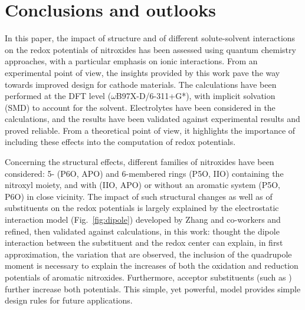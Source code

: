 \documentclass[review,preprint]{elsarticle}
\begin{document}
\clearpage
\section{Conclusions and outlooks} \label{sec:conclusion}

In this paper, the impact of structure and of  different solute-solvent interactions  on the redox potentials of nitroxides has been assessed using quantum chemistry approaches, with a particular emphasis on ionic interactions. From an experimental point of view, the insights provided by this work pave the way towards improved design for cathode materials. The calculations have been performed at the DFT level ($\omega$B97X-D/6-311+G*), with implicit solvation (SMD) to account for the  solvent. Electrolytes have been considered in the calculations, and the results have been validated against experimental results and proved reliable. From a theoretical point of view, it highlights the importance of including these effects into the computation of redox potentials.

Concerning the structural effects, different families of nitroxides have been considered: 5- (P6O, APO) and 6-membered rings (P5O, IIO) containing the nitroxyl moiety, and with (IIO, APO) or without an aromatic system (P5O, P6O) in close vicinity. The impact of such structural changes as well as of substituents on the redox potentials is largely explained by the electrostatic interaction model (Fig.~\ref{fig:dipole}) developed by Zhang and co-workers \cite{zhangEffectHeteroatomFunctionality2018} and refined, then validated against calculations, in this work: thought the dipole interaction between the substituent and the redox center can explain, in first approximation, the variation that are observed, the inclusion of the quadrupole moment is necessary to explain the increases of both the oxidation and reduction potentials of aromatic nitroxides. Furthermore, acceptor substituents (such as ) further increase both potentials. This simple, yet powerful, model provides simple design rules for future applications.
\end{document}
